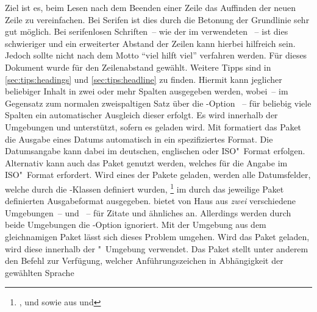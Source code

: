 \begin{DeclarePackages}
  Ziel ist es, beim Lesen nach dem Beenden einer Zeile das Auffinden der neuen 
  Zeile zu vereinfachen. Bei Serifen ist dies durch die Betonung der Grundlinie 
  sehr gut möglich. Bei serifenlosen Schriften~-- wie der im \TUDCD verwendeten 
  \OpenSans~-- ist dies schwieriger und ein erweiterter Abstand der Zeilen kann 
  hierbei hilfreich sein. Jedoch sollte nicht nach dem Motto 
  \enquote{viel hilft viel} verfahren werden. Für dieses Dokument wurde 
   für den Zeilenabstand gewählt. 
  Weitere Tipps sind in \autoref{sec:tips:headings} und   
  \autoref{sec:tips:headline} zu finden.
  Hiermit kann jeglicher beliebiger Inhalt in zwei oder mehr Spalten ausgegeben 
  werden, wobei~-- im Gegensatz zum normalen zweispaltigen Satz über die
  \KOMAScript-Option ~-- für beliebig viele Spalten ein 
  automatischer Ausgleich dieser erfolgt. Es wird innerhalb der Umgebungen 
   und  unterstützt, sofern es 
  geladen wird.
  Mit  formatiert das Paket  
  die Ausgabe eines Datums automatisch in ein spezifiziertes Format. Die 
  Datumsangabe kann dabei im deutschen, englischen oder ISO"~Format erfolgen. 
  Alternativ kann auch das Paket  genutzt werden, welches 
  für  die Angabe im ISO"~Format erfordert. 
  Wird eines der Pakete geladen, werden alle Datumsfelder, welche durch die 
  \TUDScript-Klassen definiert wurden,%
  \footnote{%
    ,  und  sowie aus 
      und %
  }
  im durch das jeweilige Paket definierten Ausgabeformat ausgegeben.
   bietet von Haus aus \emph{zwei} verschiedene Umgebungen~-- 
   und ~-- für Zitate und ähnliches 
  an. Allerdings werden durch beide Umgebungen die \KOMAScript-Option 
   ignoriert. Mit der Umgebung  aus 
  dem gleichnamigen Paket lässt sich dieses Problem umgehen. Wird das Paket 
  geladen, wird diese innerhalb der "~Umgebung verwendet.
  Das Paket stellt unter anderem den Befehl  zur 
  Verfügung, welcher Anführungszeichen in Abhängigkeit der gewählten Sprache 

\end{DeclarePackages}
